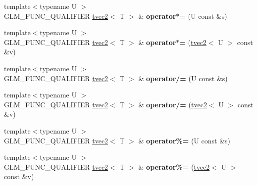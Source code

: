 \begin{DoxyCompactItemize}
\item 
\hypertarget{structglm_1_1detail_1_1tvec2_a77e4780649d39846f10151a2f1128141}{{\footnotesize template$<$typename U $>$ }\\G\-L\-M\-\_\-\-F\-U\-N\-C\-\_\-\-Q\-U\-A\-L\-I\-F\-I\-E\-R \hyperlink{structglm_1_1detail_1_1tvec2}{tvec2}$<$ T $>$ \& {\bfseries operator$\ast$=} (U const \&s)}\label{structglm_1_1detail_1_1tvec2_a77e4780649d39846f10151a2f1128141}

\item 
\hypertarget{structglm_1_1detail_1_1tvec2_a09d1e3313484e44a17bfdb50167670a5}{{\footnotesize template$<$typename U $>$ }\\G\-L\-M\-\_\-\-F\-U\-N\-C\-\_\-\-Q\-U\-A\-L\-I\-F\-I\-E\-R \hyperlink{structglm_1_1detail_1_1tvec2}{tvec2}$<$ T $>$ \& {\bfseries operator$\ast$=} (\hyperlink{structglm_1_1detail_1_1tvec2}{tvec2}$<$ U $>$ const \&v)}\label{structglm_1_1detail_1_1tvec2_a09d1e3313484e44a17bfdb50167670a5}

\item 
\hypertarget{structglm_1_1detail_1_1tvec2_a8eda19ea5ffa0cab5d30122313fb6f5d}{{\footnotesize template$<$typename U $>$ }\\G\-L\-M\-\_\-\-F\-U\-N\-C\-\_\-\-Q\-U\-A\-L\-I\-F\-I\-E\-R \hyperlink{structglm_1_1detail_1_1tvec2}{tvec2}$<$ T $>$ \& {\bfseries operator/=} (U const \&s)}\label{structglm_1_1detail_1_1tvec2_a8eda19ea5ffa0cab5d30122313fb6f5d}

\item 
\hypertarget{structglm_1_1detail_1_1tvec2_a993ef4db9669426751839ce2f6c575b7}{{\footnotesize template$<$typename U $>$ }\\G\-L\-M\-\_\-\-F\-U\-N\-C\-\_\-\-Q\-U\-A\-L\-I\-F\-I\-E\-R \hyperlink{structglm_1_1detail_1_1tvec2}{tvec2}$<$ T $>$ \& {\bfseries operator/=} (\hyperlink{structglm_1_1detail_1_1tvec2}{tvec2}$<$ U $>$ const \&v)}\label{structglm_1_1detail_1_1tvec2_a993ef4db9669426751839ce2f6c575b7}

\item 
\hypertarget{structglm_1_1detail_1_1tvec2_a4c0d9778afdee006437be0d93ff681df}{{\footnotesize template$<$typename U $>$ }\\G\-L\-M\-\_\-\-F\-U\-N\-C\-\_\-\-Q\-U\-A\-L\-I\-F\-I\-E\-R \hyperlink{structglm_1_1detail_1_1tvec2}{tvec2}$<$ T $>$ \& {\bfseries operator\%=} (U const \&s)}\label{structglm_1_1detail_1_1tvec2_a4c0d9778afdee006437be0d93ff681df}

\item 
\hypertarget{structglm_1_1detail_1_1tvec2_a295cc271433cdbd9c6976b210facff5e}{{\footnotesize template$<$typename U $>$ }\\G\-L\-M\-\_\-\-F\-U\-N\-C\-\_\-\-Q\-U\-A\-L\-I\-F\-I\-E\-R \hyperlink{structglm_1_1detail_1_1tvec2}{tvec2}$<$ T $>$ \& {\bfseries operator\%=} (\hyperlink{structglm_1_1detail_1_1tvec2}{tvec2}$<$ U $>$ const \&v)}\label{structglm_1_1detail_1_1tvec2_a295cc271433cdbd9c6976b210facff5e}


\end{DoxyCompactItemize}
